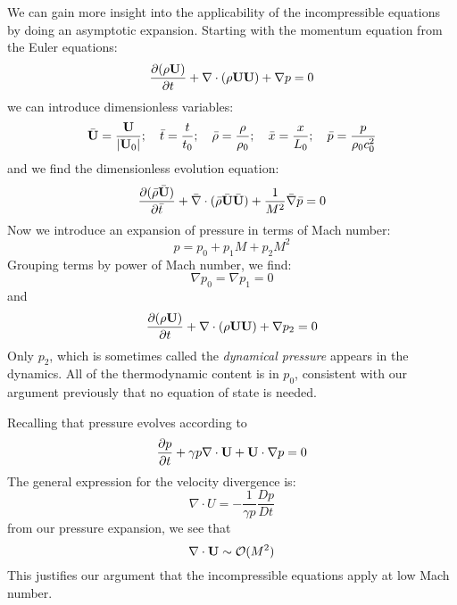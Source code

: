 We can gain more insight into the applicability of the incompressible
equations by doing an asymptotic expansion.  Starting with the momentum
equation from the Euler equations:
\begin{equation}
\frac{\partial (\rho {\bf U})}{\partial t} + {\nabla}\cdot (\rho {\bf U}{\bf U}) + {\nabla}p = 0
\end{equation}
we can introduce dimensionless variables:
\begin{equation}
\bar{\bf U} = \frac{{\bf U}}{|{\bf U}_0|} ; \quad \bar{t} = \frac{t}{t_0} ; \quad \bar{\rho} = \frac{\rho}{\rho_0} ; \quad \bar{x} = \frac{x}{L_0} ; \quad \bar{p} = \frac{p}{\rho_0 c_0^2}
\end{equation}
and we find the dimensionless evolution equation:
\begin{equation}
\frac{\partial (\bar{\rho} \bar{\bf U})}{\partial \bar{t}} + \bar{\nabla} \cdot (\bar{\rho} \bar{\bf U}\bar{\bf U}) + \frac{1}{M^2} \bar{\nabla} \bar{p} = 0
\end{equation}
Now we introduce an expansion of pressure in terms of Mach number:
\begin{equation}
p = p_0 + p_1 M + p_2 M^2
\end{equation}
Grouping terms by power of Mach number, we find:
\begin{equation}
\nabla p_0 = \nabla p_1 = 0
\end{equation}
and
\begin{equation}
\frac{\partial (\rho {\bf U})}{\partial t} + {\nabla}\cdot (\rho {\bf U}{\bf U}) + {\nabla}p_2 = 0
\end{equation}
Only $p_2$, which is sometimes called the {\em dynamical pressure} appears in the dynamics.
All of the thermodynamic content is in $p_0$, consistent with our argument previously
that no equation of state is needed.

Recalling that pressure evolves according to
\begin{equation}
\frac{\partial p}{\partial t} + \gamma p {\nabla}\cdot {\bf U} + {\bf U}\cdot {\nabla}p = 0
\end{equation}
The general expression for the velocity divergence is:
\begin{equation}
{\nabla}\cdot {U} = -\frac{1}{\gamma p} \frac{Dp}{Dt}
\end{equation}
from our pressure expansion, we see that
\begin{equation}
\nabla \cdot {\bf U} \sim  \mathcal{O}(M^2)
\end{equation}
This justifies our argument that the incompressible equations apply at low Mach number.


